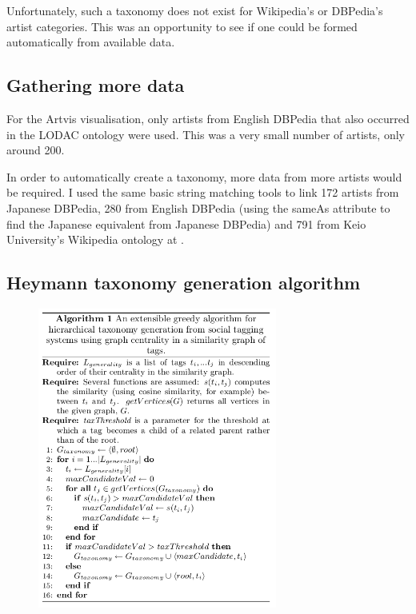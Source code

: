 \documentclass[11pt]{article}
\begin{document}
Unfortunately, such a taxonomy does not exist for Wikipedia's or DBPedia's artist categories. This was an opportunity to see if one could be formed automatically from available data.

\subsection{Gathering more data}
For the Artvis visualisation, only artists from English DBPedia that also occurred in the LODAC ontology were used. This was a very small number of artists, only around 200.

In order to automatically create a taxonomy, more data from more artists would be required. I used the same basic string matching tools to link 172 artists from Japanese DBPedia, 280 from English DBPedia (using the sameAs attribute to find the Japanese equivalent from Japanese DBPedia) and 791 from Keio University's Wikipedia ontology at \cite{keio}.

\subsection{Heymann taxonomy generation algorithm}
\begin{figure}
        \centering
                \includegraphics[width=0.7\textwidth]{algorithm.png}
\end{figure}
\end{document}
